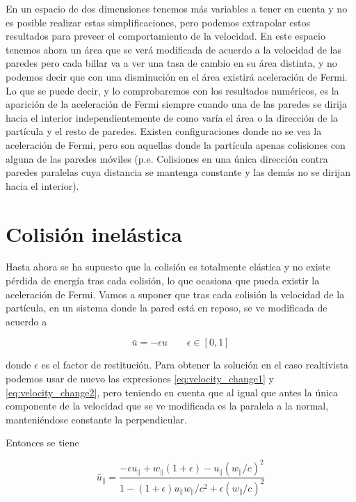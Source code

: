 \documentclass[11pt, spanish]{book}
\begin{document}
En un espacio de dos dimensiones tenemos más variables a tener en cuenta y no es posible realizar estas simplificaciones, pero podemos extrapolar estos resultados para preveer el comportamiento de la velocidad. En este espacio tenemos ahora un área que se verá modificada de acuerdo a la velocidad de las paredes pero cada billar va a ver una tasa de cambio en su área distinta, y no podemos decir que con una disminución en el área existirá aceleración de Fermi. Lo que se puede decir, y lo comprobaremos con los resultados numéricos, es la aparición de la aceleración de Fermi siempre cuando una de las paredes se dirija hacia el interior independientemente de como varía el área o la dirección de la partícula y el resto de paredes. Existen configuraciones donde no se vea la aceleración de Fermi, pero son aquellas donde la partícula apenas colisiones con alguna de las paredes móviles (p.e. Colisiones en una única dirección contra paredes paralelas cuya distancia se mantenga constante y las demás no se dirijan hacia el interior).

\section{Colisión inelástica}

Hasta ahora se ha supuesto que la colisión es totalmente elástica y no existe pérdida de energía tras cada colisión, lo que ocasiona que pueda existir la aceleración de Fermi. Vamos a suponer que tras cada colisión la velocidad de la partícula, en un sistema donde la pared está en reposo, se ve modificada de acuerdo a 

\begin{equation}
    \bar{u} = -\epsilon u \qquad \epsilon \in \left[ 0, 1 \right]
\end{equation}

donde \( \epsilon \) es el factor de restitución. Para obtener la solución en el caso realtivista podemos usar de nuevo las expresiones \ref{eq:velocity_change1} y \ref{eq:velocity_change2}, pero teniendo en cuenta que al igual que antes la única componente de la velocidad que se ve modificada es la paralela a la normal, manteniéndose constante la perpendicular. 

\vspace{3mm}

Entonces se tiene

\begin{equation}
    \bar{u}_\parallel = \dfrac{-\epsilon u_\parallel + w_\parallel (1 + \epsilon) -  u_\parallel (w_\parallel/c)^2}{1 - (1 + \epsilon)u_\parallel w_\parallel/c^2 + \epsilon (w_\parallel/c)^2}
\end{equation}
\end{document}
